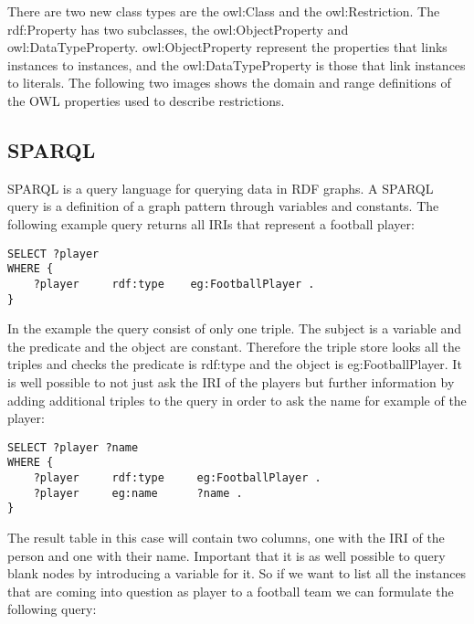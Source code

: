 

There are two new class types are the owl:Class and the owl:Restriction. The rdf:Property has two subclasses, the owl:ObjectProperty and owl:DataTypeProperty. owl:ObjectProperty represent the properties that links instances to instances, and the owl:DataTypeProperty is those that link instances to literals. The following two images shows the domain and range definitions of the OWL properties used to describe restrictions.


\subsection{SPARQL}

SPARQL is a query language for querying data in RDF graphs. A SPARQL query is a definition of a graph pattern through variables and constants. The following example query returns all IRIs that represent a football player: 

\begin{lstlisting}[captionpos=b, caption=SPARQL Query I., label=lst:sparql, belowskip=1em, aboveskip=2em, 
basicstyle=\footnotesize,frame=single]
SELECT ?player  
WHERE { 
	?player		rdf:type	eg:FootballPlayer .	
}
\end{lstlisting}

In the example the query consist of only one triple. The subject is a variable and the predicate and the object are constant. Therefore the triple store looks all the triples and checks the predicate is rdf:type and the object is eg:FootballPlayer. 
It is well possible to not just ask the IRI of the players but further information by adding additional triples to the query in order to ask the name for example of the player:

\begin{lstlisting}[captionpos=b, caption=SPARQL Query II., label=2nd:sparql, belowskip=1em, aboveskip=2em,
basicstyle=\footnotesize,frame=single]
SELECT ?player ?name 
WHERE { 
	?player		rdf:type	 eg:FootballPlayer .	
	?player		eg:name		 ?name .
}
\end{lstlisting}

The result table in this case will contain two columns, one with the IRI of the person and one with their name. Important that it is as well possible to query blank nodes by introducing a variable for it. So if we want to list all the instances that are coming into question as player to a football team we can formulate the following query:


